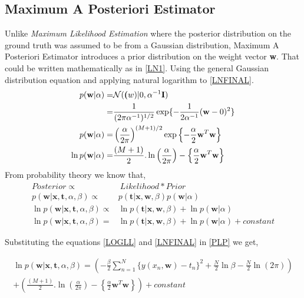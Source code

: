 \documentclass[12pt,twoside,a4paper]{article}
\begin{document}

\subsection{Maximum A Posteriori Estimator}
Unlike \textit{Maximum Likelihood Estimation} where the posterior distribution on the ground truth was assumed to be from a Gaussian distribution, Maximum A Posteriori Estimator introduces a prior distribution on the weight vector \textbf{w}. That could be written mathematically as in \eqref{LN1}. Using the general Gaussian distribution equation and applying natural logarithm to \eqref{LNFINAL}.
\begin{align}
p(\textbf{w}|\alpha) =& \mathcal{N}(\textbf(w)|0,\alpha^{-1}\textbf{I}) \label{LN1}\\
=& \frac{1}{(2\pi\alpha^{-1})^{1/2}}\exp\{-\frac{1}{2\alpha^{-1}}(\textbf{w}-0)^2\} \\
p(\textbf{w}|\alpha) =& \left( \frac{\alpha}{2\pi}\right)^{(M+1)/2} \exp\left\{ -\frac{\alpha}{2}\textbf{w}^T\textbf{w}\right\} \\
\ln p(\textbf{w}|\alpha) =& \frac{(M+1)}{2}.\ln\left( \frac{\alpha}{2\pi}\right) - \left\{ \frac{\alpha}{2}\textbf{w}^T\textbf{w}\right\} \label{LNFINAL}
\end{align}
From probability theory we know that,
\begin{align}
Posterior \propto& \ Likelihood * Prior\\
    p(\textbf{w}|\textbf{x},\textbf{t},\alpha,\beta) \propto& p(\textbf{t}|\textbf{x},\textbf{w},\beta) p(\textbf{w}|\alpha) \\
    \ln p(\textbf{w}|\textbf{x},\textbf{t},\alpha,\beta) \propto& \ln p(\textbf{t}|\textbf{x},\textbf{w},\beta) + \ln p(\textbf{w}|\alpha) \\
    \ln p(\textbf{w}|\textbf{x},\textbf{t},\alpha,\beta) =& \ln p(\textbf{t}|\textbf{x},\textbf{w},\beta) + \ln p(\textbf{w}|\alpha) + constant \label{PLP}
\end{align}

Substituting the equations \eqref{LOGLL} and \eqref{LNFINAL} in \eqref{PLP} we get,

\begin{multline}
        \ln p(\textbf{w}|\textbf{x},\textbf{t},\alpha,\beta) = {\left( -\frac{\beta}{2}\sum_{n=1}^{N} {\{y(x_n,\textbf{w})-t_n\}^2} + \frac{N}{2}\ln\beta - \frac{N}{2}\ln(2\pi) \right )} \\ + \left ( \frac{(M+1)}{2}.\ln\left( \frac{\alpha}{2\pi}\right) - \left\{ \frac{\alpha}{2}\textbf{w}^T\textbf{w}\right\} \right ) + constant
\end{multline}
\end{document}
